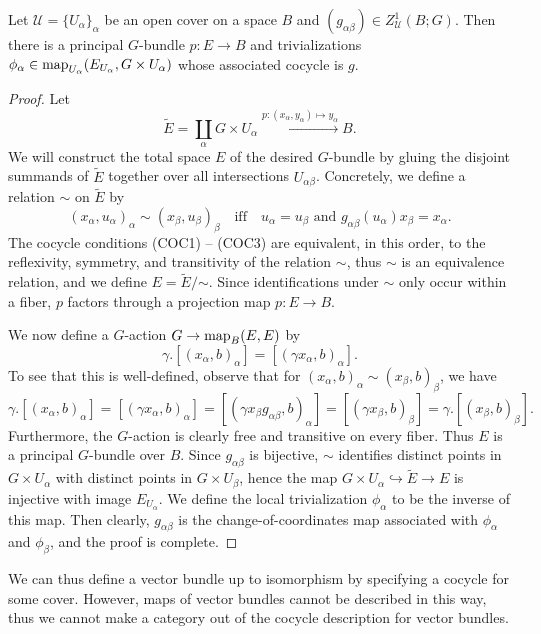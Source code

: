 \documentclass[a4paper,openany]{scrbook}
\begin{document}
\begin{prop}\label{prop:cocycleexistence}
Let $\mathcal U = \{U_\alpha\}_\alpha$ be an open cover on a space $B$ and $(g_{\alpha\beta}) \in Z^1_{\mathcal U}(B;G)$. Then there is a principal $G$-bundle $p\colon E \to B$ and trivializations $\phi_\alpha\in \operatorname{map}_{U_\alpha}(E_{U_\alpha},G \times U_{\alpha})$ whose associated cocycle is $g$.
\end{prop}
\begin{proof}
Let
\[
\tilde E = \coprod_{\alpha} G \times U_\alpha \xrightarrow{p\colon (x_\alpha,y_\alpha) \mapsto y_\alpha} B.
\]
We will construct the total space $E$ of the desired $G$-bundle by gluing the disjoint summands of $\tilde E$ together over all intersections $U_{\alpha\beta}$. Concretely, we define a relation $\sim$ on $\tilde E$ by
\[
  (x_\alpha,u_\alpha)_{\alpha} \sim (x_\beta,u_\beta)_{\beta} \quad \text{iff} \quad u_\alpha=u_\beta \text{ and } g_{\alpha\beta}(u_\alpha) x_\beta = x_\alpha.
\]
The cocycle conditions (COC1) -- (COC3) are equivalent, in this order, to the reflexivity, symmetry, and transitivity of the relation $\sim$, thus $\sim$ is an equivalence relation, and we define $E = \tilde E/\mathord{\sim}$. Since identifications under $\sim$ only occur within a fiber, $p$ factors through a projection map $p\colon E \to B$.

We now define a $G$-action $G \to \operatorname{map}_B(E,E)$ by
\[
  \gamma.[(x_\alpha,b)_{\alpha}] = [(\gamma x_\alpha,b)_{\alpha}].
\]
To see that this is well-defined, observe that for $(x_{\alpha},b)_{\alpha} \sim (x_\beta,b)_{\beta}$, we have
\[
  \gamma.[(x_\alpha,b)_{\alpha}] = [(\gamma x_\alpha,b)_{\alpha}] =[(\gamma x_\beta g_{\alpha\beta},b)_{\alpha}]=[(\gamma x_\beta,b)_{\beta}] = \gamma.[(x_\beta,b)_{\beta}].
\]
Furthermore, the $G$-action is clearly free and transitive on every fiber. Thus $E$ is a principal $G$-bundle over $B$. Since $g_{\alpha\beta}$ is bijective, $\sim$ identifies distinct points in $G \times U_\alpha$ with distinct points in $G \times U_\beta$, hence the map $G \times U_\alpha \hookrightarrow \tilde E \to E$ is injective with image $E_{U_\alpha}$. We define the local trivialization $\phi_\alpha$ to be the inverse of this map. Then clearly, $g_{\alpha\beta}$ is the change-of-coordinates map associated with $\phi_\alpha$ and $\phi_\beta$, and the proof is complete.
\end{proof}

We can thus define a vector bundle up to isomorphism by specifying a cocycle for some cover. However, maps of vector bundles cannot be described in this way, thus we cannot make a category out of the cocycle description for vector bundles. 
\end{document}
